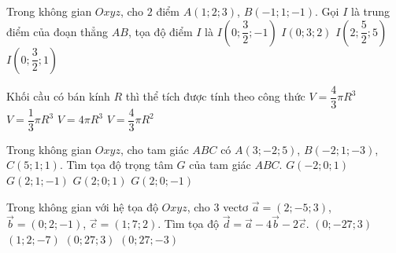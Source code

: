 \begin{ex}%
	Trong không gian $Oxyz$, cho $2$ điểm $A(1;2;3)$, $B(-1;1;-1)$. Gọi $I$ là trung điểm của đoạn thẳng $AB$, tọa độ điểm $I$ là
	\choice
	{$I\left(0;\dfrac{3}{2};-1\right)$}
	{$I(0;3;2)$}
	{$I\left(2;\dfrac{5}{2};5\right)$}
	{\True $I\left(0;\dfrac{3}{2};1\right)$}
\end{ex}

\begin{ex}%
	Khối cầu có bán kính $R$ thì thể tích được tính theo công thức
	\choice
	{\True $V=\dfrac{4}{3}\pi R^3$}
	{$V=\dfrac{1}{3}\pi R^3$}
	{$V=4\pi R^3$}
	{$V=\dfrac{4}{3}\pi R^2$}
\end{ex}

\begin{ex}%
	Trong không gian $Oxyz$, cho tam giác $ABC$ có $A(3;-2;5)$, $B(-2;1;-3)$, $C(5;1;1)$. Tìm tọa độ trọng tâm $G$ của tam giác $ABC$.
	\choice
	{$G(-2;0;1)$}
	{$G(2;1;-1)$}
	{\True $G(2;0;1)$}
	{$G(2;0;-1)$}
\end{ex}

\begin{ex}%
	Trong không gian với hệ tọa độ $Oxyz$, cho $3$ vectơ $\vec{a}=\left(2;-5;3\right)$, $\vec{b}=\left(0;2;-1\right)$, $\vec{c}=\left(1;7;2\right)$. Tìm tọa độ $\vec{d}=\vec{a}-4\vec{b}-2\vec{c}$.
	\choice
	{\True $\left(0;-27;3\right)$}
	{$\left(1;2;-7\right)$}
	{$\left(0;27;3\right)$}
	{$\left(0;27;-3\right)$}
\end{ex}

